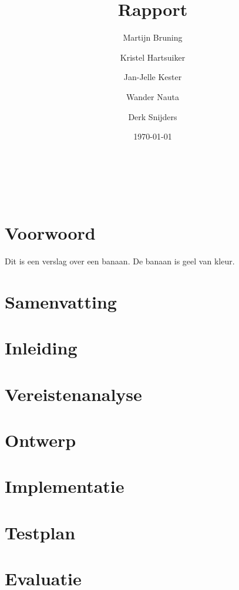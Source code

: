 \documentclass[twoside,openright,parskip]{scrreprt}
\title{Rapport}
\author{
     Martijn Bruning
\and Kristel Hartsuiker
\and Jan-Jelle Kester
\and Wander Nauta
\and Derk Snijders
}
\date{\today}
\begin{document}
\renewcommand*\rmdefault{ppl}
\renewcommand*\sfdefault{ppl}

\begin{titlepage}
	{\Huge \thetitle} \\
	\vfill
	\theauthor \\
	\thedate
\end{titlepage}

\chapter{Voorwoord}

Dit is een verslag over een \gls{banaan}. De banaan is geel van kleur. 

\chapter{Samenvatting}

\lipsum

\tableofcontents

\chapter{Inleiding}

\lipsum

\chapter{Vereistenanalyse}

\lipsum

\chapter{Ontwerp}

\lipsum

\chapter{Implementatie}

\lipsum

\chapter{Testplan}

\lipsum

\chapter{Evaluatie}
\end{document}
